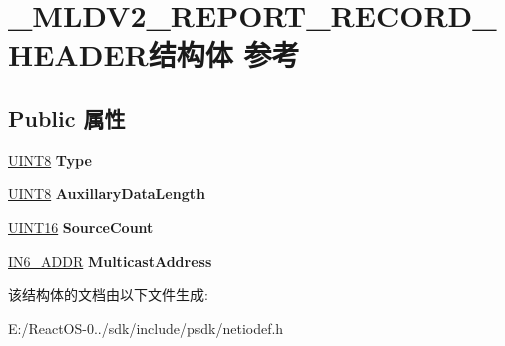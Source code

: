 \hypertarget{struct___m_l_d_v2___r_e_p_o_r_t___r_e_c_o_r_d___h_e_a_d_e_r}{}\section{\+\_\+\+M\+L\+D\+V2\+\_\+\+R\+E\+P\+O\+R\+T\+\_\+\+R\+E\+C\+O\+R\+D\+\_\+\+H\+E\+A\+D\+E\+R结构体 参考}
\label{struct___m_l_d_v2___r_e_p_o_r_t___r_e_c_o_r_d___h_e_a_d_e_r}
\subsection*{Public 属性}
\begin{DoxyCompactItemize}
\item 
\mbox{\label{struct___m_l_d_v2___r_e_p_o_r_t___r_e_c_o_r_d___h_e_a_d_e_r_a267e8fe4b8239bbffcbca95cdee8dac9}} 
\hyperlink{_processor_bind_8h_ab27e9918b538ce9d8ca692479b375b6a}{U\+I\+N\+T8} {\bfseries Type}
\item 
\mbox{\label{struct___m_l_d_v2___r_e_p_o_r_t___r_e_c_o_r_d___h_e_a_d_e_r_ad36ace5756a7fe66e310ca26bc3c8a82}} 
\hyperlink{_processor_bind_8h_ab27e9918b538ce9d8ca692479b375b6a}{U\+I\+N\+T8} {\bfseries Auxillary\+Data\+Length}
\item 
\mbox{\label{struct___m_l_d_v2___r_e_p_o_r_t___r_e_c_o_r_d___h_e_a_d_e_r_a62b14aea5711c1a663d0f52b1e29c624}} 
\hyperlink{_processor_bind_8h_a09f1a1fb2293e33483cc8d44aefb1eb1}{U\+I\+N\+T16} {\bfseries Source\+Count}
\item 
\mbox{\label{struct___m_l_d_v2___r_e_p_o_r_t___r_e_c_o_r_d___h_e_a_d_e_r_af3f816dccfb0451b7720af2f6d5baa7f}} 
\hyperlink{structin6__addr}{I\+N6\+\_\+\+A\+D\+DR} {\bfseries Multicast\+Address}
\end{DoxyCompactItemize}


该结构体的文档由以下文件生成\+:\begin{DoxyCompactItemize}
\item 
E\+:/\+React\+O\+S-\/0../sdk/include/psdk/netiodef.\+h\end{DoxyCompactItemize}
